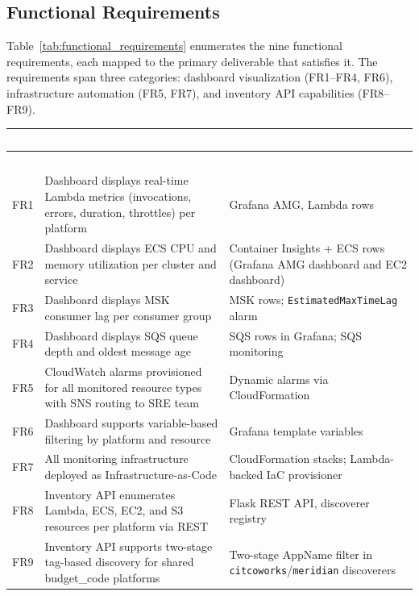 \subsection{Functional Requirements}

Table~\ref{tab:functional_requirements} enumerates the nine functional
requirements, each mapped to the primary deliverable that satisfies it.
The requirements span three categories: dashboard visualization (FR1--FR4, FR6),
infrastructure automation (FR5, FR7), and inventory API capabilities (FR8--FR9).

\begin{tabularx}{\textwidth}{@{\hspace{\tabcolsep}}>{\raggedright\arraybackslash}p{}>{\raggedright\arraybackslash}X>{\raggedright\arraybackslash}p{}@{\hspace{\tabcolsep}}}
\caption{Functional Requirements} \label{tab:functional_requirements} \\
\hline
\rowcolor{smubrand}\textcolor{white}{\textbf{ID}} & \textcolor{white}{\textbf{Requirement}} & \textcolor{white}{\textbf{Satisfied By}} \\
\hline
\endfirsthead
\hline
\rowcolor{smubrand}\textcolor{white}{\textbf{ID}} & \textcolor{white}{\textbf{Requirement}} & \textcolor{white}{\textbf{Satisfied By}} \\
\hline
\endhead
\hline
\endfoot
\rowcolor{tablerowA} FR1 & Dashboard displays real-time Lambda metrics (invocations, errors, duration, throttles) per platform & Grafana AMG, Lambda rows \\
\rowcolor{tablerowB} FR2 & Dashboard displays ECS CPU and memory utilization per cluster and service & Container Insights + ECS rows (Grafana AMG dashboard and EC2 dashboard) \\
\rowcolor{tablerowA} FR3 & Dashboard displays MSK consumer lag per consumer group & MSK rows; \texttt{EstimatedMaxTimeLag} alarm \\
\rowcolor{tablerowB} FR4 & Dashboard displays SQS queue depth and oldest message age & SQS rows in Grafana; SQS monitoring \\
\rowcolor{tablerowA} FR5 & CloudWatch alarms provisioned for all monitored resource types with SNS routing to SRE team & Dynamic alarms via CloudFormation \\
\rowcolor{tablerowB} FR6 & Dashboard supports variable-based filtering by platform and resource & Grafana template variables \\
\rowcolor{tablerowA} FR7 & All monitoring infrastructure deployed as Infrastructure-as-Code & 4 CloudFormation stacks; Lambda-backed IaC provisioner \\
\rowcolor{tablerowB} FR8 & Inventory API enumerates Lambda, ECS, EC2, and S3 resources per platform via REST & Flask REST API, discoverer registry \\
\rowcolor{tablerowA} FR9 & Inventory API supports two-stage tag-based discovery for shared budget\_code platforms & Two-stage AppName filter in \texttt{citcoworks}/\texttt{meridian} discoverers \\
\hline
\end{tabularx}

